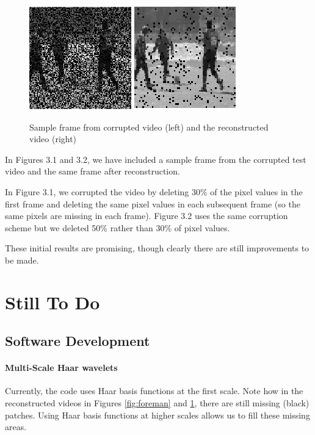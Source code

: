 \documentclass[final,3p]{report}
\begin{document}
\begin{figure}
\label{fig:soccer}
\center
\includegraphics{corr2.png}
\includegraphics{rec2.png}
\caption{Sample frame from corrupted video (left) and the reconstructed video (right)}
\end{figure}

In Figures 3.1 and 3.2, we have included a sample frame from the corrupted test video and the same frame after reconstruction.

In Figure 3.1, we corrupted the video by deleting 30\% of the pixel values in the first frame and deleting the same pixel values in each subsequent frame (so the same pixels are missing in each frame).
Figure 3.2 uses the same corruption scheme but we deleted 50\% rather than 30\% of pixel values.

These initial results are promising, though clearly there are still improvements to be made.

\chapter{Still To Do}

\section{Software Development}
\subsubsection{Multi-Scale Haar wavelets}
Currently, the code uses Haar basis functions at the first scale. 
Note how in the reconstructed videos in Figures \ref{fig:foreman} and \ref{fig:soccer}, there are still missing (black) patches.
Using Haar basis functions at higher scales allows us to fill these missing areas.
\end{document}
